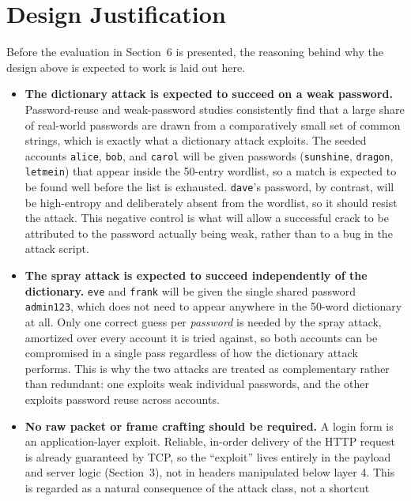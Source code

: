 \documentclass[11pt]{article}
\begin{document}
\section{Design Justification}

Before the evaluation in Section~6 is presented, the reasoning behind why the
design above is expected to work is laid out here.

\begin{itemize}[leftmargin=*]
  \item \textbf{The dictionary attack is expected to succeed on a weak password.}
    Password-reuse and weak-password studies consistently find that a large share
    of real-world passwords are drawn from a comparatively small set of common
    strings, which is exactly what a dictionary attack exploits. The seeded
    accounts \texttt{alice}, \texttt{bob}, and \texttt{carol} will be given
    passwords (\texttt{sunshine}, \texttt{dragon}, \texttt{letmein}) that appear
    inside the 50-entry wordlist, so a match is expected to be found well before
    the list is exhausted. \texttt{dave}'s password, by contrast, will be
    high-entropy and deliberately absent from the wordlist, so it should resist
    the attack. This negative control is what will allow a successful crack to be
    attributed to the password actually being weak, rather than to a bug in the
    attack script.
  \item \textbf{The spray attack is expected to succeed independently of the
    dictionary.} \texttt{eve} and \texttt{frank} will be given the single shared
    password \texttt{admin123}, which does not need to appear anywhere in the
    50-word dictionary at all. Only one correct guess per \emph{password} is
    needed by the spray attack, amortized over every account it is tried
    against, so both accounts can be compromised in a single pass regardless of
    how the dictionary attack performs. This is why the two attacks are treated
    as complementary rather than redundant: one exploits weak individual
    passwords, and the other exploits password reuse across accounts.
  \item \textbf{No raw packet or frame crafting should be required.} A login form
    is an application-layer exploit. Reliable, in-order delivery of the HTTP
    request is already guaranteed by TCP, so the ``exploit'' lives entirely in the
    payload and server logic (Section~3), not in headers manipulated below layer 4.
    This is regarded as a natural consequence of the attack class, not a shortcut

\end{itemize}
\end{document}
